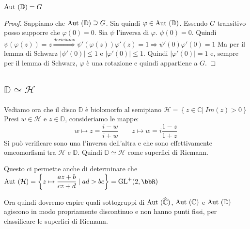 \begin{proposizione}
	$\text{Aut }(\mathbb{D})=G$
\end{proposizione}
\begin{proof}
	Sappiamo che $\text{Aut }(\mathbb{D}) \supseteq G$. Sia quindi $\varphi \in \text{Aut }(\mathbb{D})$. Essendo $G$ transitivo posso supporre che $\varphi(0)=0$.
Sia $\psi$ l'inversa di $\varphi$. $\psi (0)=0$. Quindi
$\psi (\varphi (z))=z \stackrel{deriviamo}{\Longrightarrow} \psi ' (\varphi (z)) \varphi '(z) =1 \Rightarrow \psi'(0) \varphi'(0) =1$
Ma per il lemma di Schwarz $|\psi'(0)| \leq 1$ e $|\varphi'(0)| \leq 1$. Quindi $|\varphi'(0)|=1$ e, sempre per il lemma di Schwarz,
$\varphi$ è una rotazione e quindi appartiene a $G$. 
\end{proof}

\subsection {$\mathbb{D} \simeq \mathcal{H}$}

Vediamo ora che il disco $\mathbb{D}$ è biolomorfo al semipiano $\mathcal{H} = \left \{ z \in \mathbb{C} | \ Im (z)>0 \right \}$
Presi $w \in \mathcal{H}$ e $z \in \mathbb{D}$, consideriamo le mappe:
$$w \mapsto z=\frac{i-w}{i+w} \qquad z \mapsto w= i\frac{1-z}{1+z}$$
Si può verificare sono una l'inversa dell'altra e che sono effettivamente omeomorfismi tra $\mathcal{H}$ e $\mathbb{D}$.
Quindi $\mathbb{D} \simeq \mathcal{H}$ come superfici di Riemann.

Questo ci permette anche di determinare che $\Aut( \mathcal{H}) = \left \{ z \mapsto \displaystyle{\frac{az+b}{cz+d}} \mid ad > bc \right \} = \GL^+ (2, \bbR)$

Ora quindi dovremo capire quali sottogruppi di $\text{Aut } (\widehat{\mathbb{C}})$, $\text{Aut }(\mathbb{C})$ e $\text{Aut }(\mathbb{D})$ agiscono in modo propriamente discontinuo
e non hanno punti fissi, per classificare le superfici di Riemann.
